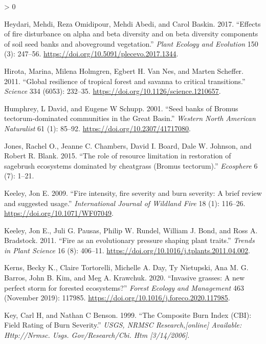 \documentclass[
  12pt,
]{article}
\newlength{\cslhangindent}
\newenvironment{CSLReferences}[2] %
 {%
  \setlength{\parindent}{0pt}
  \ifodd #1 \everypar{\setlength{\hangindent}{\cslhangindent}}\ignorespaces\fi
  \ifnum #2 > 0
  \setlength{\parskip}{#2\baselineskip}
  \fi
 }%
 {}
\begin{document}
\begin{CSLReferences}{1}{0}
\leavevmode\hypertarget{ref-Heydari2017}{}%
Heydari, Mehdi, Reza Omidipour, Mehdi Abedi, and Carol Baskin. 2017.
{``{Effects of fire disturbance on alpha and beta diversity and on beta
diversity components of soil seed banks and aboveground vegetation}.''}
\emph{Plant Ecology and Evolution} 150 (3): 247--56.
\url{https://doi.org/10.5091/plecevo.2017.1344}.

\leavevmode\hypertarget{ref-Hirota2011}{}%
Hirota, Marina, Milena Holmgren, Egbert H. Van Nes, and Marten Scheffer.
2011. {``{Global resilience of tropical forest and savanna to critical
transitions}.''} \emph{Science} 334 (6053): 232--35.
\url{https://doi.org/10.1126/science.1210657}.

\leavevmode\hypertarget{ref-Humphrey2001}{}%
Humphrey, L David, and Eugene W Schupp. 2001. {``{Seed banks of Bromus
tectorum-dominated communities in the Great Basin}.''} \emph{Western
North American Naturalist} 61 (1): 85--92.
\url{https://doi.org/10.2307/41717080}.

\leavevmode\hypertarget{ref-Jones2015}{}%
Jones, Rachel O., Jeanne C. Chambers, David I. Board, Dale W. Johnson,
and Robert R. Blank. 2015. {``{The role of resource limitation in
restoration of sagebrush ecosystems dominated by cheatgrass (Bromus
tectorum)}.''} \emph{Ecosphere} 6 (7): 1--21.

\leavevmode\hypertarget{ref-Keeley2009}{}%
Keeley, Jon E. 2009. {``{Fire intensity, fire severity and burn
severity: A brief review and suggested usage}.''} \emph{International
Journal of Wildland Fire} 18 (1): 116--26.
\url{https://doi.org/10.1071/WF07049}.

\leavevmode\hypertarget{ref-Keeley2011}{}%
Keeley, Jon E., Juli G. Pausas, Philip W. Rundel, William J. Bond, and
Ross A. Bradstock. 2011. {``{Fire as an evolutionary pressure shaping
plant traits}.''} \emph{Trends in Plant Science} 16 (8): 406--11.
\url{https://doi.org/10.1016/j.tplants.2011.04.002}.

\leavevmode\hypertarget{ref-Kerns2020}{}%
Kerns, Becky K., Claire Tortorelli, Michelle A. Day, Ty Nietupski, Ana
M. G. Barros, John B. Kim, and Meg A. Krawchuk. 2020. {``{Invasive
grasses: A new perfect storm for forested ecosystems?}''} \emph{Forest
Ecology and Management} 463 (November 2019): 117985.
\url{https://doi.org/10.1016/j.foreco.2020.117985}.

\leavevmode\hypertarget{ref-Key1999}{}%
Key, Carl H, and Nathan C Benson. 1999. {``The Composite Burn Index
(CBI): Field Rating of Burn Severity.''} \emph{USGS, NRMSC
Research,{[}online{]} Available: Http://Nrmsc. Usgs. Gov/Research/Cbi.
Htm {[}3/14/2006{]}}.


\end{CSLReferences}
\end{document}
